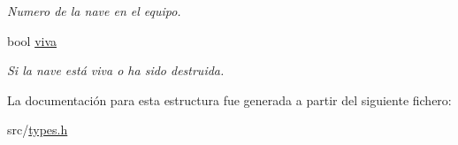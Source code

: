 \begin{DoxyCompactItemize}
\begin{DoxyCompactList}\small\item\em Numero de la nave en el equipo. \end{DoxyCompactList}\item 
\mbox{\label{structtipo__nave_a5fd530b54ff7694b07d41d3a168b800c}} 
bool \hyperlink{structtipo__nave_a5fd530b54ff7694b07d41d3a168b800c}{viva}
\begin{DoxyCompactList}\small\item\em Si la nave está viva o ha sido destruida. \end{DoxyCompactList}\end{DoxyCompactItemize}


La documentación para esta estructura fue generada a partir del siguiente fichero\+:\begin{DoxyCompactItemize}
\item 
src/\hyperlink{types_8h}{types.\+h}\end{DoxyCompactItemize}
